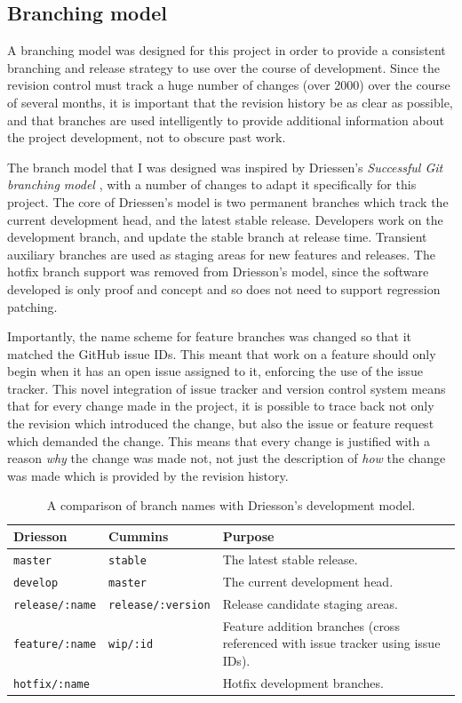 \subsection{Branching model}

A branching model was designed for this project in order to provide a
consistent branching and release strategy to use over the course of
development. Since the revision control must track a huge number of
changes (over 2000) over the course of several months, it is important
that the revision history be as clear as possible, and that branches
are used intelligently to provide additional information about the
project development, not to obscure past work.

The branch model that I was designed was inspired by Driessen's
\textit{Successful Git branching model} \cite{driessen2012successful},
with a number of changes to adapt it specifically for this
project. The core of Driessen's model is two permanent branches which
track the current development head, and the latest stable
release. Developers work on the development branch, and update the
stable branch at release time. Transient auxiliary branches are used
as staging areas for new features and releases. The hotfix branch
support was removed from Driesson's model, since the software
developed is only proof and concept and so does not need to support
regression patching.

Importantly, the name scheme for feature branches was changed so that
it matched the GitHub issue IDs. This meant that work on a feature
should only begin when it has an open issue assigned to it, enforcing
the use of the issue tracker. This novel integration of issue tracker
and version control system means that for every change made in the
project, it is possible to trace back not only the revision which
introduced the change, but also the issue or feature request which
demanded the change. This means that every change is justified with a
reason \textit{why} the change was made not, not just the description
of \textit{how} the change was made which is provided by the revision
history.


\begin{table}[H]
\centering
\begin{tabular}{l l L{8cm}}
\textbf{Driesson} & \textbf{Cummins} & \textbf{Purpose}\\
\hline
\texttt{master} & \texttt{stable} & The latest stable release.\\
\texttt{develop} & \texttt{master} & The current development head.\\
\texttt{release/:name} & \texttt{release/:version} & Release candidate staging areas.\\
\texttt{feature/:name} & \texttt{wip/:id} & Feature addition branches (cross referenced with issue tracker using issue IDs).\\
\texttt{hotfix/:name} & & Hotfix development branches.\\
\end{tabular}
\caption[Development model branch names]
        {A comparison of branch names with Driesson's development model.}
\label{tab:branch-names}
\end{table}


